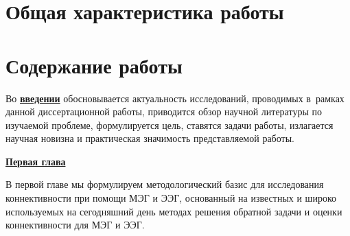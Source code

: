 
\section*{Общая характеристика работы}

\newcommand{\actuality}{\underline{\textbf{\actualityTXT}}}
\newcommand{\progress}{\underline{\textbf{\progressTXT}}}
\newcommand{\aim}{\underline{{\textbf\aimTXT}}}
\newcommand{\tasks}{\underline{\textbf{\tasksTXT}}}
\newcommand{\novelty}{\underline{\textbf{\noveltyTXT}}}
\newcommand{\influence}{\underline{\textbf{\influenceTXT}}}
\newcommand{\methods}{\underline{\textbf{\methodsTXT}}}
\newcommand{\defpositions}{\underline{\textbf{\defpositionsTXT}}}
\newcommand{\reliability}{\underline{\textbf{\reliabilityTXT}}}
\newcommand{\probation}{\underline{\textbf{\probationTXT}}}
\newcommand{\contribution}{\underline{\textbf{\contributionTXT}}}
\newcommand{\publications}{\underline{\textbf{\publicationsTXT}}}




\section*{Содержание работы}
Во \underline{\textbf{введении}} обосновывается актуальность
исследований, проводимых в~рамках данной диссертационной работы,
приводится обзор научной литературы по изучаемой проблеме,
формулируется цель, ставятся задачи работы, излагается научная новизна
и практическая значимость представляемой работы.


\underline{\textbf{Первая глава}}

В первой главе мы формулируем методологический базис для исследования коннективности
при помощи МЭГ и ЭЭГ, основанный на известных и широко используемых на сегодняшний
день методах решения обратной задачи и оценки коннективности для МЭГ и ЭЭГ.

